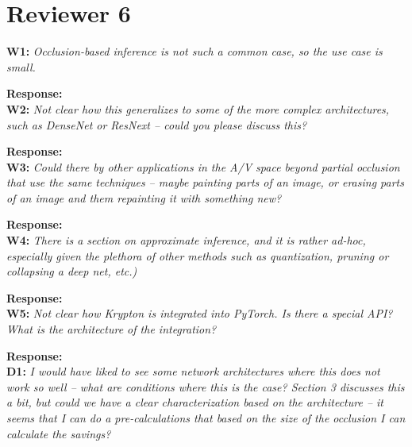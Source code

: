 \documentclass[preprint]{vldb}
\begin{document}
\section{Reviewer 6}

\vspace{2mm}
\noindent \textbf{W1:} \textit{Occlusion-based inference is not such a common case, so the use case is small.}

\vspace{2mm}
\noindent \textbf{Response:}\\

\vspace{2mm}
\noindent \textbf{W2:} \textit{Not clear how this generalizes to some of the more complex architectures, such as DenseNet or ResNext -- could you please discuss this?}

\vspace{2mm}
\noindent \textbf{Response:}\\

\vspace{2mm}
\noindent \textbf{W3:} \textit{Could there by other applications in the A/V space beyond partial occlusion that use the same techniques -- maybe painting parts of an image, or erasing parts of an image and them repainting it with something new?}

\vspace{2mm}
\noindent \textbf{Response:}\\


\vspace{2mm}
\noindent \textbf{W4:} \textit{There is a section on approximate inference, and it is rather ad-hoc, especially given the plethora of other methods such as quantization, pruning or collapsing a deep net, etc.)}

\vspace{2mm}
\noindent \textbf{Response:}\\

\vspace{2mm}
\noindent \textbf{W5:} \textit{Not clear how Krypton is integrated into PyTorch. Is there a special API? What is the architecture of the integration?}

\vspace{2mm}
\noindent \textbf{Response:}\\

\vspace{2mm}
\noindent \textbf{D1:} \textit{I would have liked to see some network architectures where this does not work so well -- what are conditions where this is the case? Section 3 discusses this a bit, but could we have a clear characterization based on the architecture -- it seems that I can do a pre-calculations that based on the size of the occlusion I can calculate the savings?}
\end{document}
